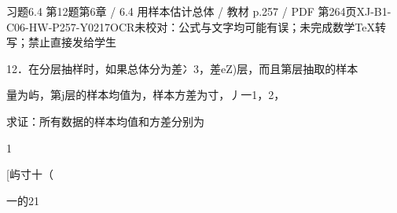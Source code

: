 \begin{bankitem}{习题6.4 第12题}{第6章 / 6.4 用样本估计总体 / 教材 p.257 / PDF 第264页}{XJ-B1-C06-HW-P257-Y0217}{OCR未校对：公式与文字均可能有误；未完成数学TeX转写；禁止直接发给学生}
\begin{ocrdraft}
\par
12．在分层抽样时，如果总体分为差冫3，差eZ)层，而且第层抽取的样本
\par
量为屿，第j层的样本均值为，样本方差为寸，丿一1，2，
\par
求证：所有数据的样本均值和方差分别为
\par
1
\par
[屿寸十（
\par
一的21
\end{ocrdraft}
\end{bankitem}

